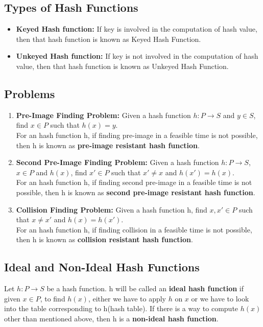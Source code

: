 \documentclass[11pt]{article}
\begin{document}
\subsection{Types of Hash Functions}
\begin{itemize}
    \item \textbf{Keyed Hash function:} If key is involved in the computation of hash value, then that hash function is known as Keyed Hash Function.
    \item \textbf{Unkeyed Hash function:} If key is not involved in the computation of hash value, then that hash function is known as Unkeyed Hash Function.
\end{itemize}

\subsection{Problems}
\begin{enumerate}
    \item \textbf{Pre-Image Finding Problem:} Given a hash function $h: P \rightarrow S$ and $y \in S$, find $x \in P$ such that $h(x) = y$.\\
    For an hash function h, if finding pre-image in a feasible time is not possible, then h is known as \textbf{pre-image resistant hash function}.

    \item \textbf{Second Pre-Image Finding Problem:} Given a hash function $h: P \rightarrow S$, $x \in P$ and $h(x)$, find $x' \in P$ such that $x' \neq x$ and $h(x') = h(x)$.\\
    For an hash function h, if finding second pre-image in a feasible time is not possible, then h is known as \textbf{second pre-image resistant hash function}.

    \item \textbf{Collision Finding Problem:} Given a hash function h, find $x, x' \in P$ such that $x \neq x'$ and $h(x) = h(x')$.\\
    For an hash function h, if finding collision in a feasible time is not possible, then h is known as \textbf{collision resistant hash function}.
\end{enumerate}

\subsection{Ideal and Non-Ideal Hash Functions}
Let $h: P \rightarrow S$ be a hash function. h will be called an \textbf{ideal hash function} if given $x \in P$, to find $h(x)$, either we have to apply $h$ on $x$ or we have to look into the table corresponding to h(hash table). If there is a way to compute $h(x)$ other than mentioned above, then h is a \textbf{non-ideal hash function}.
\end{document}
